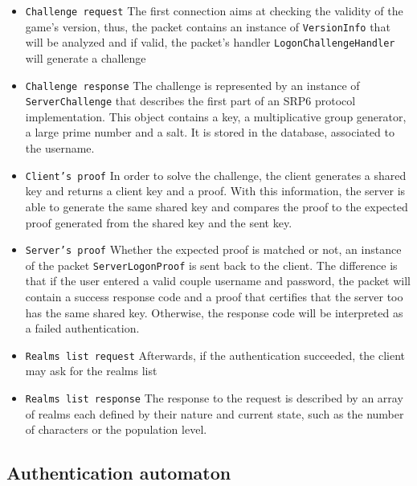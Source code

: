 \documentclass[paper=a4, fontsize=11pt]{scrartcl}
\begin{document}
\begin{itemize}
    \item \texttt{Challenge request}
        The first connection aims at checking the validity of the game's version, 
        thus, the packet contains an instance of \texttt{VersionInfo} that will 
        be analyzed and if valid, the packet's handler
        \texttt{LogonChallengeHandler} will generate a challenge

    \item \texttt{Challenge response}
        The challenge is represented by an instance of \texttt{ServerChallenge}
        that describes the first part of an SRP6 protocol implementation. This
        object contains a key, a multiplicative group generator, a large
        prime number and a salt. It is stored in the database, associated to the
        username.

    \item \texttt{Client's proof}
        In order to solve the challenge, the client generates a shared key and returns
        a client key and a proof. With this information, the server is able to generate the
        same shared key and compares the proof to the expected proof generated from the
        shared key and the sent key. 

    \item \texttt{Server's proof}
        Whether the expected proof is matched or not, an instance of the packet 
        \texttt{ServerLogonProof} is sent back to the client. The difference 
        is that if the user entered a valid couple username and password, the packet 
        will contain a success response code and a proof that certifies that the 
        server too has the same shared key. Otherwise, the response code will be 
        interpreted as a failed authentication.

    \item \texttt{Realms list request}
        Afterwards, if the authentication succeeded, the client may ask for the
        realms list

    \item \texttt{Realms list response}
        The response to the request is described by an array of realms each
        defined by their nature and current state, such as the number of
        characters or the population level.

\end{itemize}

\FloatBarrier{}

\subsection{Authentication automaton}
\end{document}

